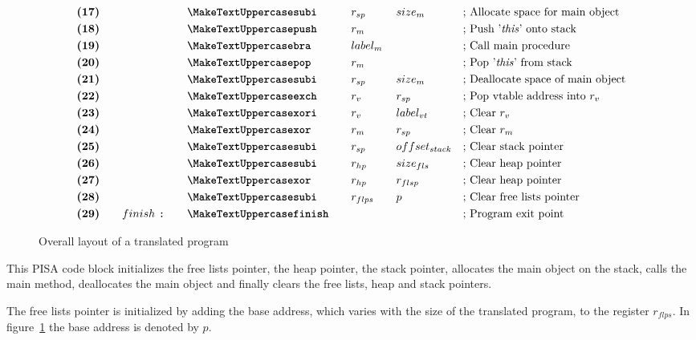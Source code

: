 \begin{figure}[h]
{\begin{minipage}{\linewidth}
\begin{alignat*}{6}
&\textbf{(17)}\quad&& &&\inst{subi}\quad &&r_{sp}\quad &&size_m\qquad &&\text{; Allocate space for main object}\\
&\textbf{(18)}\quad&& &&\inst{push}\quad &&r_m\quad && &&\text{; Push '\textit{this}' onto stack}\\
&\textbf{(19)}\quad&& &&\inst{bra}\quad &&label_m \span\omit\span \qquad&&\text{; Call main procedure}\\
&\textbf{(20)}\quad&& &&\inst{pop}\quad &&r_m\quad && &&\text{; Pop '\textit{this}' from stack}\\
&\textbf{(21)}\quad&& &&\inst{subi}\quad &&r_{sp}\quad &&size_m\qquad &&\text{; Deallocate space of main object}\\
&\textbf{(22)}\quad&& &&\inst{exch}\quad &&r_v\quad &&r_{sp}\qquad &&\text{; Pop vtable address into $r_v$}\\
&\textbf{(23)}\quad&& &&\inst{xori}\quad &&r_v\quad &&label_{vt}\qquad &&\text{; Clear $r_v$}\\
&\textbf{(24)}\quad&& &&\inst{xor}\quad &&r_m\quad &&r_{sp}\qquad &&\text{; Clear $r_m$}\\
&\textbf{(25)}\quad&& &&\inst{subi}\quad &&r_{sp}\quad &&offset_{stack} &&\text{; Clear stack pointer}\\
&\textbf{(26)}\quad&& &&\inst{subi}\quad &&r_{hp}\quad &&size_{fls} &&\text{; Clear heap pointer}\\
&\textbf{(27)}\quad&& &&\inst{xor}\quad &&r_{hp}\quad &&r_{flsp} &&\text{; Clear heap pointer}\\
&\textbf{(28)}\quad&& &&\inst{subi}\quad &&r_{flps}\quad &&p &&\text{; Clear free lists pointer}\\
&\textbf{(29)}\quad&&finish\ \texttt{:}\quad&&\inst{finish}\quad && && &&\text{; Program exit point}
\end{alignat*}
\end{minipage}
}

\caption{Overall layout of a translated \rooplpp program}
\label{fig:pisa-program-layout}
\end{figure}

This PISA code block initializes the free lists pointer, the heap pointer, the stack pointer, allocates the main object on the stack, calls the main method, deallocates the main object and finally clears the free lists, heap and stack pointers.

The free lists pointer is initialized by adding the base address, which varies with the size of the translated program, to the register $r_{flps}$. In figure~\ref{fig:pisa-program-layout} the base address is denoted by $p$.

